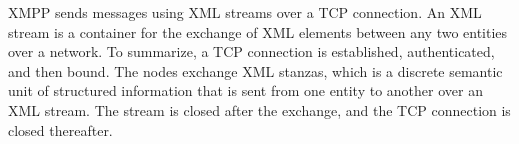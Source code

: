 XMPP sends messages using XML streams over a TCP connection. An XML stream is a 
container for the exchange of XML elements between any two entities over 
a network\cite{rfc3920}. To summarize, a TCP connection is established, authenticated, and then bound. The nodes exchange XML stanzas, which is a discrete semantic unit of structured information that is sent from one entity to another over an XML stream. The stream is closed after the exchange, and the TCP connection is closed thereafter.

